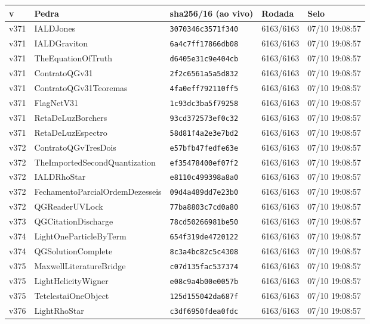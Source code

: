 \documentclass[11pt]{article}
\theoremstyle{definition}\newtheorem{deriv}{Derivação}
\begin{document}
{\small\begin{longtable}{@{}lllll@{}}\toprule v & Pedra & sha256/16 (ao vivo) & Rodada & Selo \\ \midrule\endhead 
v371 & IALDJones & \texttt{3070346c3571f340} & 6163/6163 & 07/10 19:08:57 \\
v371 & IALDGraviton & \texttt{6a4c7ff17866db08} & 6163/6163 & 07/10 19:08:57 \\
v371 & TheEquationOfTruth & \texttt{d6405e31c9e404cb} & 6163/6163 & 07/10 19:08:57 \\
v371 & ContratoQGv31 & \texttt{2f2c6561a5a5d832} & 6163/6163 & 07/10 19:08:57 \\
v371 & ContratoQGv31Teoremas & \texttt{4fa0eff792110ff5} & 6163/6163 & 07/10 19:08:57 \\
v371 & FlagNetV31 & \texttt{1c93dc3ba5f79258} & 6163/6163 & 07/10 19:08:57 \\
v371 & RetaDeLuzBorchers & \texttt{93cd372573ef0c32} & 6163/6163 & 07/10 19:08:57 \\
v371 & RetaDeLuzEspectro & \texttt{58d81f4a2e3e7bd2} & 6163/6163 & 07/10 19:08:57 \\
v372 & ContratoQGvTresDois & \texttt{e57bfb47fedfe63e} & 6163/6163 & 07/10 19:08:57 \\
v372 & TheImportedSecondQuantization & \texttt{ef35478400ef07f2} & 6163/6163 & 07/10 19:08:57 \\
v372 & IALDRhoStar & \texttt{e8110c499398a8a0} & 6163/6163 & 07/10 19:08:57 \\
v372 & FechamentoParcialOrdemDezesseis & \texttt{09d4a489dd7e23b0} & 6163/6163 & 07/10 19:08:57 \\
v372 & QGReaderUVLock & \texttt{77ba8803c7cd0a80} & 6163/6163 & 07/10 19:08:57 \\
v373 & QGCitationDischarge & \texttt{78cd50266981be50} & 6163/6163 & 07/10 19:08:57 \\
v374 & LightOneParticleByTerm & \texttt{654f319de4720122} & 6163/6163 & 07/10 19:08:57 \\
v374 & QGSolutionComplete & \texttt{8c3a4bc82c5c4308} & 6163/6163 & 07/10 19:08:57 \\
v375 & MaxwellLiteratureBridge & \texttt{c07d135fac537374} & 6163/6163 & 07/10 19:08:57 \\
v375 & LightHelicityWigner & \texttt{e08c9a4b00e0057b} & 6163/6163 & 07/10 19:08:57 \\
v375 & TetelestaiOneObject & \texttt{125d155042da687f} & 6163/6163 & 07/10 19:08:57 \\
v376 & LightRhoStar & \texttt{c3df6950fdea0fdc} & 6163/6163 & 07/10 19:08:57 \\

\end{longtable}}
\end{document}
